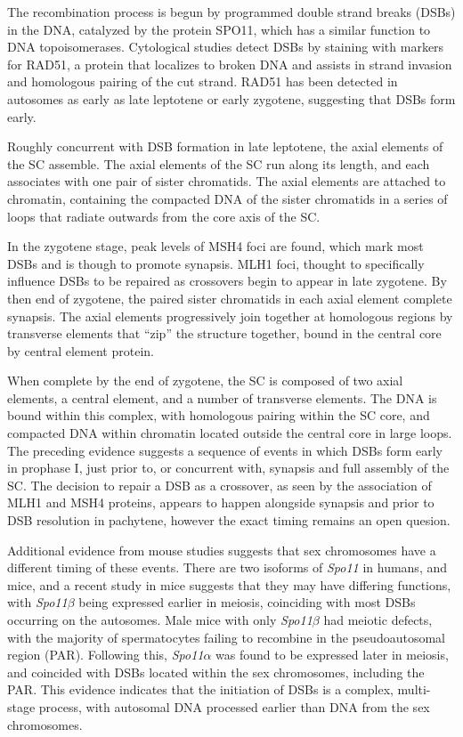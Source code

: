 The recombination process is begun by programmed double strand breaks (DSBs) in the DNA, catalyzed by the protein SPO11, which has a similar function to DNA topoisomerases\cite{DeMassy2013}.
Cytological studies detect DSBs by staining with markers for RAD51, a protein that localizes to broken DNA and assists in strand invasion and homologous pairing of the cut strand.
RAD51 has been detected in autosomes as early as late leptotene or early zygotene\cite{Oliver-Bonet2005}, suggesting that DSBs form early.

Roughly concurrent with DSB formation in late leptotene, the axial elements of the SC assemble\cite{Yang2009}.
The axial elements of the SC run along its length, and each associates with one pair of sister chromatids.
The axial elements are attached to chromatin, containing the compacted DNA of the sister chromatids in a series of loops that radiate outwards from the core axis of the SC.

In the zygotene stage, peak levels of MSH4 foci are found, which mark most DSBs and is though to promote synapsis\cite{Oliver-Bonet2005}.
MLH1 foci, thought to specifically influence DSBs to be repaired as crossovers begin to appear in late zygotene.
By then end of zygotene, the paired sister chromatids in each axial element complete synapsis.
The axial elements progressively join together at homologous regions by transverse elements that ``zip'' the structure together, bound in the central core by central element protein\cite{Yang2009}.

When complete by the end of zygotene, the SC is composed of two axial elements, a central element, and a number of transverse elements\cite{Yang2009}.
The DNA is bound within this complex, with homologous pairing within the SC core, and compacted DNA within chromatin located outside the central core in large loops.
The preceding evidence suggests a sequence of events in which DSBs form early in prophase I, just prior to, or concurrent with, synapsis and full assembly of the SC.
The decision to repair a DSB as a crossover, as seen by the association of MLH1 and MSH4 proteins, appears to happen alongside synapsis and prior to DSB resolution in pachytene, however the exact timing remains an open quesion\cite{Baudat2007}.

Additional evidence from mouse studies suggests that sex chromosomes have a different timing of these events.
There are two isoforms of \textit{Spo11} in humans, and mice, and a recent study in mice suggests that they may have differing functions, with \textit{Spo11$\beta$} being expressed earlier in meiosis, coinciding with most DSBs occurring on the autosomes.
Male mice with only \textit{Spo11$\beta$} had meiotic defects, with the majority of spermatocytes failing to recombine in the pseudoautosomal region (PAR).
Following this, \textit{Spo11$\alpha$} was found to be expressed later in meiosis, and coincided with DSBs located within the sex chromosomes, including the PAR\cite{Kauppi2011,DeMassy2013}.
This evidence indicates that the initiation of DSBs is a complex, multi-stage process, with autosomal DNA processed earlier than DNA from the sex chromosomes.


